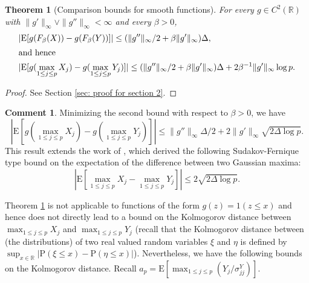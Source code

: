 \documentclass[11pt,reqno]{amsart}
\newtheorem{theorem}{Theorem}
\theoremstyle{definition}
\newtheorem{remark}{Comment}
\newcommand{\Ep}{{\mathrm{E}}}
\renewcommand{\Pr}{{\mathrm{P}}}
\newcommand{\RR}{\mathbb{R}}
\begin{document}
\begin{theorem}[Comparison bounds for smooth functions]
\label{theorem:comparison}
For every  $g \in C^2(\RR)$ with $\| g' \|_{\infty} \vee \| g'' \|_{\infty} < \infty$ and every $\beta>0$,
\begin{align*}
&| \Ep[g(F_{\beta}(X)) - g(F_{\beta}(Y))] |  \leq (\| g'' \|_{\infty}/2 +  \beta \| g' \|_{\infty})\Delta,\\
\intertext{and hence}
& | \Ep   [ g (\max_{1 \leq j \leq p}X_{j} ) - g(\max_{1 \leq j \leq p} Y_{j}) ] | \leq (\| g'' \|_{\infty}/2 +  \beta \| g' \|_{\infty}) \Delta + 2 \beta^{-1} \| g' \|_{\infty} \log p.
\end{align*}
\end{theorem}
\begin{proof}
See Section \ref{sec: proof for section 2}.
\end{proof}

\begin{remark}
Minimizing the second bound with respect to $\beta > 0$, we have
\begin{equation*}
| \Ep [ g (\max_{1 \leq j \leq p}X_{j} ) - g(\max_{1 \leq j \leq p} Y_{j})] |  \leq \| g'' \|_{\infty}\Delta/2+ 2\| g' \|_{\infty}\sqrt{2\Delta\log p}.
\end{equation*}
This result extends the work of \cite{Chatterjee2005b}, which derived the following Sudakov-Fernique type bound on the expectation of the difference between two Gaussian maxima:
\begin{equation*}
| \Ep [ \max_{1 \leq j \leq p}X_{j} - \max_{1 \leq j \leq p} Y_{j}] |  \leq  2\sqrt{2\Delta\log p}.
\end{equation*}
\end{remark}

Theorem \ref{theorem:comparison} is not applicable to functions of the form $g(z) = 1(z \leq x)$ and hence does not directly lead to a bound on the Kolmogorov distance between $\max_{1 \leq j \leq p} X_{j}$ and $\max_{1 \leq j \leq p} Y_{j}$ (recall that the Kolmogorov distance between (the distributions) of two real valued random variables
$\xi$ and $\eta$ is defined by $\sup_{x \in \RR} | \Pr ( \xi \leq x ) - \Pr (\eta \leq x) |$).
Nevertheless, we have the following bounds on the Kolmogorov distance. Recall $a_p=\Ep [ \max_{1 \leq j \leq p} (Y_{j}/\sigma^{Y}_{jj})]$.
\end{document}
